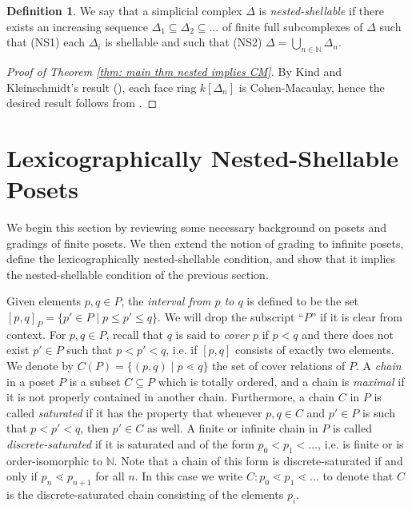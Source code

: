 \documentclass[oneside,11pt,reqno]{amsart}
\newcommand{\nn}{\ensuremath{\mathbb{N}}}
\theoremstyle{definition}
\newtheorem{definition}{Definition}
\newtheorem{proof techniques}{Proof Techniques}
\begin{document}
\begin{definition}
    We say that a simplicial complex $\Delta$ is \emph{nested-shellable} if there exists an increasing sequence $\Delta_1 \subseteq \Delta_2 \subseteq \ldots$ of finite full subcomplexes of $\Delta$ such that (NS1) each $\Delta_i$ is shellable and such that (NS2) $\Delta = \bigcup_{n \in \nn} \Delta_n$. 
\end{definition}

\begin{proof}[Proof of Theorem \ref{thm: main thm nested implies CM}]
    By Kind and Kleinschmidt's result (\cite{kind_schalbare_1979}), each face ring $k[\Delta_n]$ is Cohen-Macaulay, hence the desired result follows from \cite[Theorem A]{chlopecki2026antidiagonal}. 
\end{proof}



\section{Lexicographically Nested-Shellable Posets}\label{sec: Lexicographically Nested-Shellable Posets}

We begin this section by reviewing some necessary background on posets and gradings of finite posets. We then extend the notion of grading to infinite posets, define the lexicographically nested-shellable condition, and show that it implies the nested-shellable condition of the previous section. 

Given elements $p , q \in P$, the \emph{interval from $p$ to $q$} is defined to be the set $[p , q]_P = \{ p' \in P \mid p \leq p' \leq q\}$. We will drop the subscript ``$P$'' if it is clear from context. For $p , q \in P$, recall that $q$ is said to \emph{cover} $p$ if $p < q$ and there does not exist $p' \in P$ such that $p < p' < q$, i.e. if $[p , q]$ consists of exactly two elements. We denote by $C(P) = \{ ( p , q) \mid p \lessdot q \}$ the set of cover relations of $P$. A \emph{chain} in a poset $P$ is a subset $C \subseteq P$ which is totally ordered, and a chain is \emph{maximal} if it is not properly contained in another chain. Furthermore, a chain $C$ in $P$ is called \emph{saturated} if it has the property that whenever $p , q \in C$ and $p' \in P$ is such that $p < p' < q$, then $p' \in C$ as well. A finite or infinite chain in $P$ is called \emph{discrete-saturated} if it is saturated and of the form $p_0 < p_1 < \ldots$, i.e. is finite or is order-isomorphic to $\nn$. Note that a chain of this form is discrete-saturated if and only if $p_n \lessdot p_{n + 1}$ for all $n$. In this case we write $C: p_0 \lessdot p_1 \lessdot \ldots$ to denote that $C$ is the discrete-saturated chain consisting of the elements $p_i$. 
\end{document}
